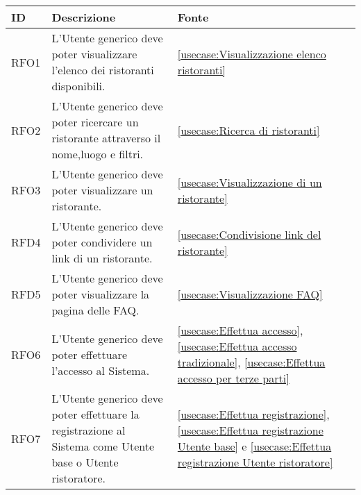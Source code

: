 \begin{table}[H]
	\renewcommand{\arraystretch}{1.5}
	\centering
	\begin{tabularx}{\textwidth}{l|X|p{2cm}}
		\textbf{ID} & \textbf{Descrizione}                                                                                       & \textbf{Fonte}                                                                                                                                               \\
		\hline
		RFO1        & L'Utente generico deve poter visualizzare l'elenco dei ristoranti disponibili.                             & \autoref{usecase:Visualizzazione elenco ristoranti}                                                                                                          \\
		\hline
		RFO2        & L'Utente generico deve poter ricercare un ristorante attraverso il nome,luogo e filtri.                    & \autoref{usecase:Ricerca di ristoranti}                                                                                                                      \\
		\hline
		RFO3        & L'Utente generico deve poter visualizzare un ristorante.                                                   & \autoref{usecase:Visualizzazione di un ristorante}                                                                                                           \\
		\hline
		RFD4        & L'Utente generico deve poter condividere un link di un ristorante.                                         & \autoref{usecase:Condivisione link del ristorante}                                                                                                           \\
		\hline
		RFD5        & L'Utente generico deve poter visualizzare la pagina delle FAQ.                                             & \autoref{usecase:Visualizzazione FAQ}                                                                                                                        \\
		\hline
		RFO6        & L'Utente generico deve poter effettuare l'accesso al Sistema.                                              & \autoref{usecase:Effettua accesso}, \autoref{usecase:Effettua accesso tradizionale}, \autoref{usecase:Effettua accesso per terze parti}                      \\
		\hline
		RFO7        & L'Utente generico deve poter effettuare la registrazione al Sistema come Utente base o Utente ristoratore. & \autoref{usecase:Effettua registrazione}, \autoref{usecase:Effettua registrazione Utente base} e \autoref{usecase:Effettua registrazione Utente ristoratore} \\

\end{tabularx}
\end{table}
